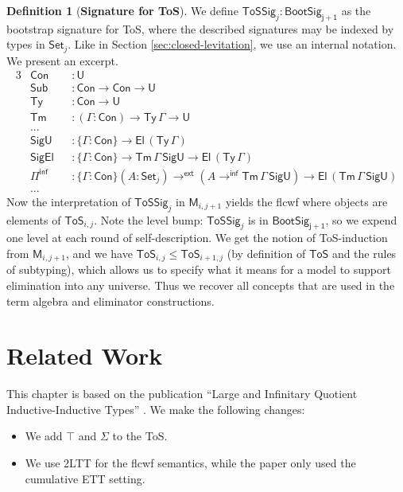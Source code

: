 \documentclass[12pt,a4paper,twoside,openany]{book}
\theoremstyle{remark}
\theoremstyle{definition}
\newtheorem{mydefinition}{Definition}
\theoremstyle{theorem}
\newcommand{\ms}[1]{\mathsf{#1}}
\newcommand{\bs}[1]{\boldsymbol{#1}}
\newcommand{\Con}{\mathsf{Con}}
\newcommand{\Sub}{\mathsf{Sub}}
\newcommand{\Tm}{\mathsf{Tm}}
\newcommand{\Ty}{\mathsf{Ty}}
\newcommand{\U}{\mathsf{U}}
\newcommand{\El}{\mathsf{El}}
\newcommand{\Set}{\mathsf{Set}}
\newcommand{\ToS}{\mathsf{ToS}}
\newcommand{\toe}{\to^{\ms{ext}}}
\newcommand{\Piinf}{\Pi^{\mathsf{inf}}}
\newcommand{\ToSSig}{\mathsf{ToSSig}}
\newcommand{\toinf}{\to^{\ms{inf}}}
\newcommand{\bM}{\bs{\mathsf{M}}}
\begin{document}
\begin{mydefinition}[\textbf{Signature for ToS}]
We define $\ToSSig_j : \ms{BootSig_{j+1}}$ as the bootstrap signature for ToS, where the
described signatures may be indexed by types in $\Set_j$. Like in Section
\ref{sec:closed-levitation}, we use an internal notation. We present an excerpt.
\begingroup
\allowdisplaybreaks
\begin{alignat*}{3}
  & \Con       &&: \U\\
  & \Sub       &&: \Con \to \Con \to \U\\
  & \Ty        &&: \Con \to \U\\
  & \Tm        &&: (\Gamma : \Con) \to \Ty\,\Gamma \to \U\\
  & ...        &&\\
  & \ms{SigU}  &&: \{\Gamma : \Con\} \to \El\,(\Ty\,\Gamma)\\
  & \ms{SigEl} &&: \{\Gamma : \Con\} \to \Tm\,\Gamma\,\ms{SigU} \to \El\,(\Ty\,\Gamma)\\
  & \Piinf     &&: \{\Gamma : \Con\}(A : \Set_j) \toe (A \toinf \Tm\,\Gamma\,\ms{SigU}) \to \El\,(\Tm\,\Gamma\,\ms{SigU})\\
  & ...        &&
\end{alignat*}
Now the interpretation of $\ToSSig_j$ in $\bM_{i,j+1}$ yields the flcwf where
objects are elements of $\ToS_{i,j}$. Note the level bump: $\ToSSig_j$ is in
$\ms{BootSig_{j+1}}$, so we expend one level at each round of self-description.
We get the notion of ToS-induction from $\bM_{i,j+1}$, and we have $\ToS_{i,j}
\leq \ToS_{i+1,j}$ (by definition of $\ToS$ and the rules of subtyping), which
allows us to specify what it means for a model to support elimination into any
universe. Thus we recover all concepts that are used in the term algebra and
eliminator constructions.
\end{mydefinition}
\endgroup


\section{Related Work}
\label{sec:iqii-related-work}

This chapter is based on the publication ``Large and Infinitary Quotient
Inductive-Inductive Types'' \cite{iqiit}. We make the following changes:
\begin{itemize}
  \item We add $\top$ and $\Sigma$ to the ToS.
  \item We use 2LTT for the flcwf semantics, while the paper only used the cumulative
        ETT setting.
\end{itemize}
\end{document}
